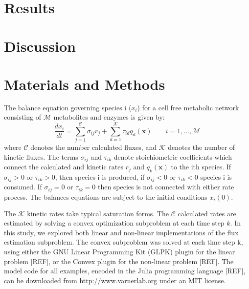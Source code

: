 \documentclass[10pt,twocolumn,twoside,final]{IEEEtran}
\begin{document}
\section{Results}



\section{Discussion}

\section{Materials and Methods}
The balance equation governing species i ($x_{i}$) for a cell free metabolic network consisting of $\mathcal{M}$ metabolites and enzymes is given by:
\begin{equation}
  \frac{dx_{i}}{dt} = \sum_{j=1}^{\mathcal{C}}\sigma_{ij}r_{j}+\sum_{d=1}^{\mathcal{K}}\tau_{id}q_{d}(\mathbf{x})\qquad{i=1,\hdots,\mathcal{M}}
\end{equation}where $\mathcal{C}$ denotes the number calculated fluxes, and $\mathcal{K}$ denotes the number of kinetic fluxes.
The terms $\sigma_{ij}$ and $\tau_{ik}$ denote stoichiometric coefficients which connect the calculated and kinetic rates $r_{j}$
and $q_{k}(\mathbf{x})$ to the ith species. If $\sigma_{ij}>0$ or $\tau_{ik}>0$, then species i is produced,
if $\sigma_{ij}<0$ or $\tau_{ik}<0$ species i is consumed.
If $\sigma_{ij}=0$ or $\tau_{ik}=0$ then species is not connected with either rate process.
The balances equations are subject to the initial conditions $x_{i}\left(0\right)$.

The $\mathcal{K}$ kinetic rates take typical saturation forms.
The $\mathcal{C}$ calculated rates are estimated by solving a convex optimization subproblem at each time step $k$.
In this study, we explored both linear and non-linear implementations of the flux estimation subproblem.
The convex subproblem was solved at each time step k, using either the GNU Linear Programming Kit (GLPK) plugin for the linear problem [REF],
or the Convex plugin for the non-linear problem [REF].
The model code for all examples, encoded in the Julia programming language [REF], can be downloaded from http://www.varnerlab.org under an MIT license.
\end{document}
